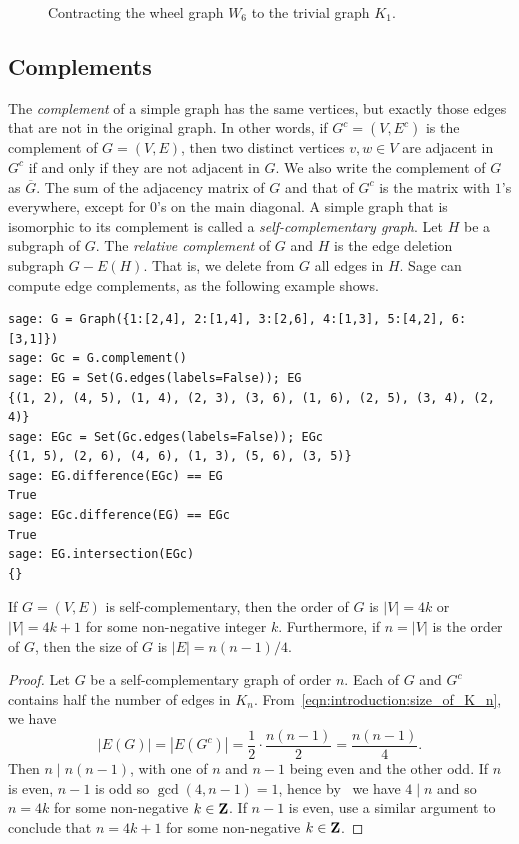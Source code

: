 \begin{figure}[!htbp]
\centering

\caption{Contracting the wheel graph $W_6$ to the trivial graph $K_1$.}
\label{fig:introduction:edge_contraction_W6_to_K1}
\end{figure}



\subsection{Complements}

The \emph{complement} of a simple graph has the same
vertices, but exactly those edges that are not in the original
graph. In other words, if $G^c = (V, E^c)$ is the
complement of $G = (V,E)$, then two distinct vertices $v,w \in V$ are
adjacent in $G^c$ if and only if they are not adjacent in $G$. We also
write the complement of $G$ as
$\overline{G}$. The sum of the adjacency matrix
of $G$ and that of $G^c$ is the matrix with $1$'s everywhere, except
for $0$'s on the main diagonal. A simple graph that is isomorphic to
its complement is called a
\emph{self-complementary graph}. Let
$H$ be a subgraph of $G$. The
\emph{relative complement} of $G$ and $H$
is the edge deletion subgraph $G - E(H)$. That is, we delete from $G$
all edges in $H$. Sage can compute edge complements, as the following
example shows.
\begin{lstlisting}
sage: G = Graph({1:[2,4], 2:[1,4], 3:[2,6], 4:[1,3], 5:[4,2], 6:[3,1]})
sage: Gc = G.complement()
sage: EG = Set(G.edges(labels=False)); EG
{(1, 2), (4, 5), (1, 4), (2, 3), (3, 6), (1, 6), (2, 5), (3, 4), (2, 4)}
sage: EGc = Set(Gc.edges(labels=False)); EGc
{(1, 5), (2, 6), (4, 6), (1, 3), (5, 6), (3, 5)}
sage: EG.difference(EGc) == EG
True
sage: EGc.difference(EG) == EGc
True
sage: EG.intersection(EGc)
{}
\end{lstlisting}

\begin{theorem}
If $G = (V, E)$ is self-complementary, then the order of $G$ is
$|V| = 4k$ or $|V| = 4k + 1$ for some non-negative integer
$k$. Furthermore, if $n = |V|$ is the order of $G$, then the size of
$G$ is $|E| = n(n - 1) / 4$.
\end{theorem}

\begin{proof}
Let $G$ be a self-complementary graph of order $n$. Each of $G$ and
$G^c$ contains half the number of edges in
$K_n$. From~\eqref{eqn:introduction:size_of_K_n}, we have
\[
|E(G)|
=
|E(G^c)|
=
\frac{1}{2} \cdot \frac{n(n - 1)}{2}
=
\frac{n(n - 1)}{4}.
\]
Then $n \;|\; n(n - 1)$, with one of $n$ and $n - 1$ being even and
the other odd. If $n$ is even, $n - 1$ is odd so $\gcd(4, n-1) = 1$,
hence by~\cite[Theorem~1.9]{Shoup2008} we have $4 \;|\; n$ and so
$n = 4k$ for some non-negative $k \in \mathbf{Z}$. If $n - 1$ is even, use a
similar argument to conclude that $n = 4k + 1$ for some non-negative
$k \in \mathbf{Z}$.
\end{proof}

